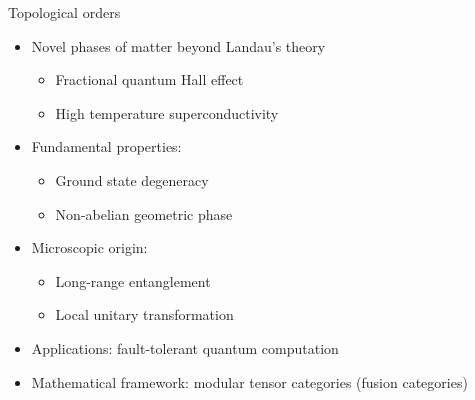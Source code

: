 \documentclass{fdubeamer}
\newcommand{\1}{\mathbb{1}}
\begin{document}
\begin{frame}{Topological orders}

\begin{itemize}
  \item Novel phases of matter beyond Landau's theory

    \begin{itemize}
      \item Fractional quantum Hall effect
      \item High temperature superconductivity
    \end{itemize}

  \item Fundamental properties:

    \begin{itemize}
      \item Ground state degeneracy
      \item Non-abelian geometric phase
    \end{itemize}

  \item Microscopic origin:

    \begin{itemize}
      \item Long-range entanglement
      \item Local unitary transformation
    \end{itemize}

  \item Applications: fault-tolerant quantum computation
  \item Mathematical framework: modular tensor categories (fusion categories)
\end{itemize}

\end{frame}
\end{document}
